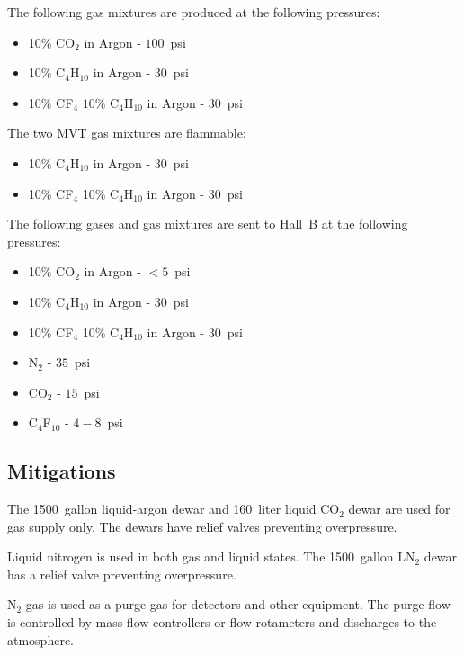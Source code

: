 The following gas mixtures are produced at the following pressures:

\begin{itemize}
\item 10\% CO$_2$ in Argon - $100$~psi
\item 10\% C$_4$H$_{10}$ in Argon - $30$~psi
\item 10\% CF$_4$ $10\%$ C$_4$H$_{10}$ in Argon - $30$~psi
\end{itemize}

The two MVT gas mixtures are flammable:

\begin{itemize}
\item 10\% C$_4$H$_{10}$ in Argon - $30$~psi
\item 10\% CF$_4$ 10\% C$_4$H$_{10}$ in Argon - $30$~psi
\end{itemize}

The following gases and gas mixtures are sent to Hall~B at the following pressures:

\begin{itemize}
\item 10\% CO$_2$ in Argon - $<5$~psi
\item 10\% C$_4$H$_{10}$ in Argon - $30$~psi
\item 10\% CF$_4$ 10\% C$_4$H$_{10}$ in Argon - $30$~psi
\item N$_2$ - $35$~psi
\item CO$_2$ - $15$~psi
\item C$_4$F$_{10}$ - $4 - 8$~psi
\end{itemize}

\subsection{Mitigations}

The 1500~gallon liquid-argon dewar and 160~liter liquid CO$_2$ dewar are used for gas supply 
only. The dewars have relief valves preventing overpressure.

Liquid nitrogen is used in both gas and liquid states. The 1500~gallon LN$_2$ dewar has a 
relief valve preventing overpressure. 

N$_2$ gas is used as a purge gas for detectors and other equipment. The purge flow is 
controlled by mass flow controllers or flow rotameters and discharges to the atmosphere.

